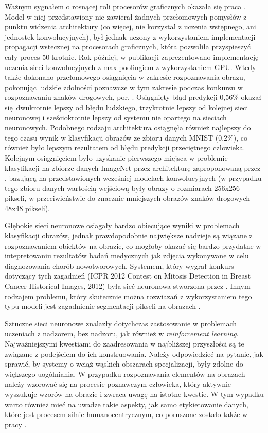 \documentclass[12pt,a4paper,twoside]{article}
\begin{document}
Ważnym sygnałem o rosnącej roli procesorów graficznych okazała się praca \citet{ciresan2010}. Model w niej przedstawiony nie zawierał żadnych przełomowych pomysłów z punktu widzenia architektury (co więcej, nie korzystał z uczenia wstępnego, ani jednostek konwolucyjnych), był jednak uczony z wykorzystaniem implementacji propagacji wstecznej na procesorach graficznych, która pozwoliła przyspieszyć cały proces 50-krotnie. Rok później, w publikacji \citet{ciresan2011a} zaprezentowano implementację uczenia sieci konwolucyjnych z max-poolingiem z wykorzystaniem GPU. Wtedy także dokonano przełomowego osiągnięcia w zakresie rozpoznawania obrazu, pokonując ludzkie zdolności poznawcze w tym zakresie podczas konkursu w rozpoznawaniu znaków drogowych, por. \citet{ciresan2011b}. Osiągnięty błąd predykcji 0,56\% okazał się dwukrotnie lepszy od błędu ludzkiego, trzykrotnie lepszy od kolejnej sieci neuronowej i sześciokrotnie lepszy od systemu nie opartego na sieciach neuronowych. Podobnego rodzaju architektura osiągnęła również najlepszy do tego czasu wynik w klasyfikacji obrazów ze zbioru danych MNIST
(0,2\%), co również było lepszym rezultatem od błędu predykcji przeciętnego człowieka.
Kolejnym osiągnięciem było uzyskanie pierwszego miejsca w problemie klasyfikacji na zbiorze danych ImageNet przez architekturę zaproponowaną przez \citet{krizhevsky2012}, bazującą na przedstawionych wcześniej modelach konwolucyjnych (w przypadku tego zbioru danych wartością wejściową były obrazy o rozmiarach 256x256 pikseli, w przeciwieństwie do znacznie mniejszych obrazów znaków drogowych - 48x48 pikseli).

Głębokie sieci neuronowe osiagały bardzo obiecujące wyniki w problemach klasyfikacji obrazów, jednak prawdopodobnie największe nadzieje są wiązane z rozpoznawaniem obiektów na obrazie, co mogłoby okazać się bardzo przydatne w intepretowaniu rezultatów badań medycznych jak zdjęcia wykonywane w celu diagnozowania chorób nowotworowych. Systemem, który wygrał konkurs dotyczący tych zagadnień (ICPR 2012 Contest on Mitosis Detection in Breast Cancer Historical Images, 2012) była sieć neuronowa stworzona przez \citet{ciresan2013}. Innym rodzajem problemu, który skutecznie można rozwiazań z wykorzystaniem tego typu modeli jest zagadnienie segmentacji pikseli na obrazach \citep{ciresan2012}.

Sztuczne sieci neuronowe znalazły dotychczas zastosowanie w problemach uczeniach z nadzorem, bez nadzoru, jak również w \textit{reinforcement learning}. Najważniejszymi kwestiami do zaadresowania w najbliższej przyszłości są te związane z podejściem do ich konstruowania. Należy odpowiedzieć na pytanie, jak sprawić, by systemy o wciąż wąskich obszarach specjalizacji, były zdolne do większego uogólniania. W przypadku rozpoznawania elementów na obrazach należy wzorować się na procesie poznawczym człowieka, który aktywnie wyszukuje wzorów na obrazie i zwraca uwagę na istotne kwestie. W tym wypadku warto również mieć na uwadze takie aspekty, jak samo etykietowanie danych, które jest procesem silnie humanocentrycznym, co poruszone zostało także w pracy \citet{misra2016}.
\end{document}
